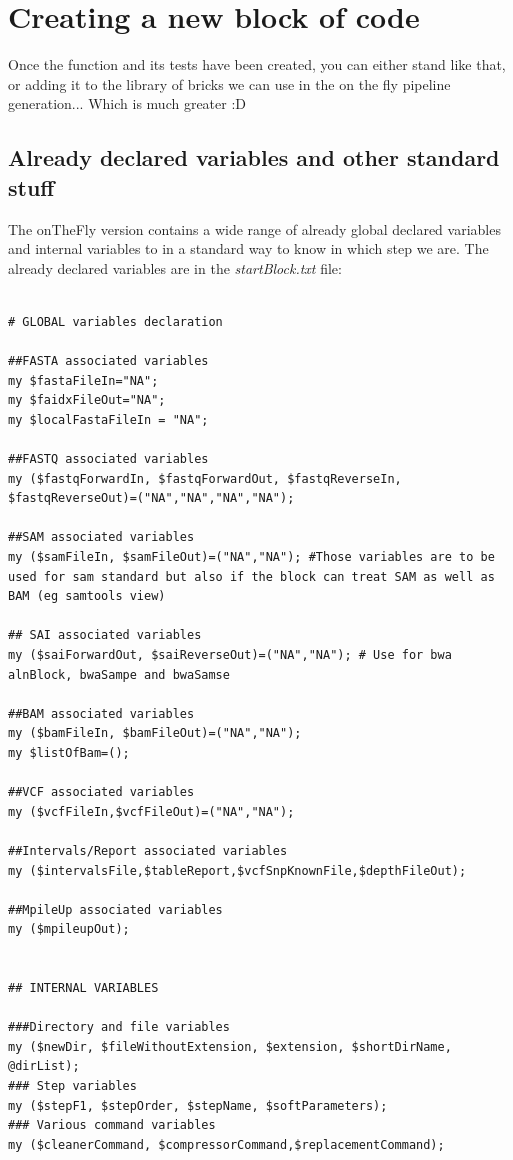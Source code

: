 \documentclass[a4paper,10pt]{report}
\begin{document}

\chapter{Creating a new block of code}
Once the function and its tests have been created, you can either stand like that, or adding it to the library of bricks we can use in the on the fly pipeline generation... Which is much greater :D

\section{Already declared variables and other standard stuff}

The onTheFly version contains a wide range of already global declared variables and internal variables to in a standard way to know in which step we are. The already declared variables are in the \emph{startBlock.txt} file:

\begin{lstlisting}

# GLOBAL variables declaration

##FASTA associated variables
my $fastaFileIn="NA";
my $faidxFileOut="NA";
my $localFastaFileIn = "NA";

##FASTQ associated variables
my ($fastqForwardIn, $fastqForwardOut, $fastqReverseIn, $fastqReverseOut)=("NA","NA","NA","NA");

##SAM associated variables
my ($samFileIn, $samFileOut)=("NA","NA"); #Those variables are to be used for sam standard but also if the block can treat SAM as well as BAM (eg samtools view)

## SAI associated variables
my ($saiForwardOut, $saiReverseOut)=("NA","NA"); # Use for bwa alnBlock, bwaSampe and bwaSamse

##BAM associated variables
my ($bamFileIn, $bamFileOut)=("NA","NA");
my $listOfBam=();

##VCF associated variables
my ($vcfFileIn,$vcfFileOut)=("NA","NA");

##Intervals/Report associated variables
my ($intervalsFile,$tableReport,$vcfSnpKnownFile,$depthFileOut);

##MpileUp associated variables
my ($mpileupOut);


## INTERNAL VARIABLES

###Directory and file variables
my ($newDir, $fileWithoutExtension, $extension, $shortDirName, @dirList);
### Step variables
my ($stepF1, $stepOrder, $stepName, $softParameters);
### Various command variables
my ($cleanerCommand, $compressorCommand,$replacementCommand);

\end{lstlisting}
\end{document}
